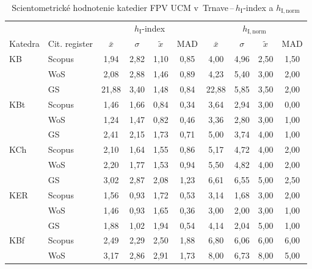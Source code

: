 \begin{table}
  \centering\small
  \caption[Hodnotenie FPV\,--\,$h_{\mathrm{I}}$-index a $h_{\mathrm{I,norm}}$]{Scientometrické hodnotenie katedier FPV UCM v~Trnave\,--\,$h_{\mathrm{I}}$-index a $h_{\mathrm{I,norm}}$}
\label{tab:4-staff.results}
\begin{tabularx}{\textwidth}{XXcccc@{\hspace{3ex}}cccc}
  \toprule\noalign{\vspace{.3ex}}
        &             & \multicolumn{4}{c}{$h_{\mathrm{I}}$-index}  & \multicolumn{4}{c}{$h_{\mathrm{I,norm}}$}  \\
Katedra & Cit. register& $\bar{x}$      & $\sigma$  & $\tilde{x}$ & MAD  & $\bar{x}$      & $\sigma$  & $\tilde{x}$  & MAD  \\[0.3ex]
  \midrule\noalign{\vspace{.5ex}}
 KB   & Scopus & 1,94     & 2,82 & 1,10 & 0,85 & 4,00    & 4,96 & 2,50 & 1,50 \\
      & WoS    & 2,08     & 2,88 & 1,46 & 0,89 & 4,23    & 5,40 & 3,00 & 2,00 \\
      & GS     & 21,88    & 3,40 & 1,48 & 0,84 & 22,88   & 5,85 & 3,50 & 2,00 \\[3ex]
 KBt  & Scopus & 1,46     & 1,66 & 0,84 & 0,34 & 3,64    & 2,94 & 3,00 & 0,00 \\
      & WoS    & 1,24     & 1,47 & 0,82 & 0,46 & 3,36    & 2,80 & 3,00 & 1,00 \\
      & GS     & 2,41     & 2,15 & 1,73 & 0,71 & 5,00    & 3,74 & 4,00 & 1,00 \\[3ex]
 KCh  & Scopus & 2,10     & 1,64 & 1,55 & 0,86 & 5,17    & 4,72 & 4,00 & 2,00 \\
      & WoS    & 2,20     & 1,77 & 1,53 & 0,94 & 5,50    & 4,82 & 4,00 & 2,00 \\
      & GS     & 3,02     & 2,87 & 2,08 & 1,23 & 6,61    & 6,55 & 5,00 & 2,50 \\[3ex]
 KER  & Scopus & 1,56     & 0,93 & 1,72 & 0,53 & 3,14    & 1,68 & 3,00 & 2,00 \\
      & WoS    & 1,46     & 0,93 & 1,65 & 0,36 & 3,00    & 2,00 & 3,00 & 1,00 \\
      & GS     & 1,88     & 1,02 & 1,94 & 0,54 & 4,14    & 2,04 & 5,00 & 1,00 \\[3ex]
 KBf  & Scopus & 2,49     & 2,29 & 2,50 & 1,88 & 6,80    & 6,06 & 6,00 & 6,00 \\
      & WoS    & 3,17     & 2,86 & 2,91 & 1,73 & 8,00    & 6,73 & 8,00 & 5,00 \\

\end{tabularx}
\end{table}
